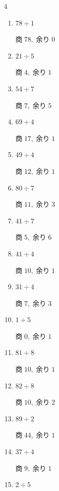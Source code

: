 \begin{multicols}{4}
\begin{enumerate}
  \item $78 \div 1$

        $商\; 78,\; 余り\; 0$

  \item $21 \div 5$

        $商\; 4,\; 余り\; 1$

  \item $54 \div 7$

        $商\; 7,\; 余り\; 5$

  \item $69 \div 4$

        $商\; 17,\; 余り\; 1$

  \item $49 \div 4$

        $商\; 12,\; 余り\; 1$

  \item $80 \div 7$

        $商\; 11,\; 余り\; 3$

\columnbreak %

\resetques

  \item $41 \div 7$

        $商\; 5,\; 余り\; 6$

  \item $41 \div 4$

        $商\; 10,\; 余り\; 1$

  \item $31 \div 4$

        $商\; 7,\; 余り\; 3$

  \item $1 \div 5$

        $商\; 0,\; 余り\; 1$

  \item $81 \div 8$

        $商\; 10,\; 余り\; 1$

  \item $82 \div 8$

        $商\; 10,\; 余り\; 2$

  \item $89 \div 2$

        $商\; 44,\; 余り\; 1$

  \item $37 \div 4$

        $商\; 9,\; 余り\; 1$

  \item $2 \div 5$


\end{enumerate}
\end{multicols}
